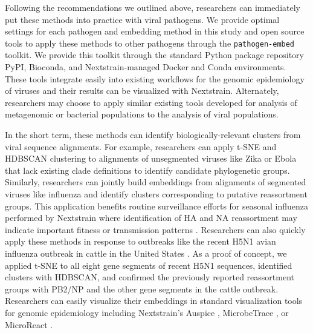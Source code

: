 \documentclass[webpdf,contemporary,large,single]{oup-authoring-template}%
\theoremstyle{thmstyleone}%
\theoremstyle{thmstyletwo}%
\theoremstyle{thmstylethree}%
\begin{document}
Following the recommendations we outlined above, researchers can immediately put these methods into practice with viral pathogens.
We provide optimal settings for each pathogen and embedding method in this study and open source tools to apply these methods to other pathogens through the \texttt{pathogen-embed} toolkit.
We provide this toolkit through the standard Python package repository PyPI, Bioconda, and Nextstrain-managed Docker and Conda environments.
These tools integrate easily into existing workflows for the genomic epidemiology of viruses and their results can be visualized with Nextstrain.
Alternately, researchers may choose to apply similar existing tools developed for analysis of metagenomic or bacterial populations \citep{Schloss2009,Schloss2020,Bolyen2019,McMurdie2013,Lees2019} to the analysis of viral populations.

In the short term, these methods can identify biologically-relevant clusters from viral sequence alignments.
For example, researchers can apply t-SNE and HDBSCAN clustering to alignments of unsegmented viruses like Zika or Ebola that lack existing clade definitions to identify candidate phylogenetic groups.
Similarly, researchers can jointly build embeddings from alignments of segmented viruses like influenza and identify clusters corresponding to putative reassortment groups.
This application benefits routine surveillance efforts for seasonal influenza performed by Nextstrain where identification of HA and NA reassortment may indicate important fitness or transmission patterns \citep{Huddleston2024}.
Researchers can also quickly apply these methods in response to outbreaks like the recent H5N1 avian influenza outbreak in cattle in the United States \citep{Nguyen2024}.
As a proof of concept, we applied t-SNE to all eight gene segments of recent H5N1 sequences, identified clusters with HDBSCAN, and confirmed the previously reported reassortment groups with PB2/NP and the other gene segments in the cattle outbreak.
Researchers can easily visualize their embeddings in standard visualization tools for genomic epidemiology including Nextstrain's Auspice \citep{Hadfield2018}, MicrobeTrace \citep{Campbell2021}, or MicroReact \citep{Argimon2016}.
\end{document}
